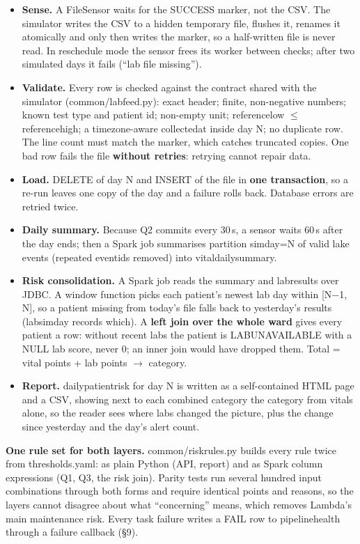 \documentclass[11pt,a4paper]{article}
\newcommand{\ubreak}{\textunderscore\allowbreak}
\newcommand{\code}[1]{{\small\ttfamily\let\_\ubreak #1}}
\begin{document}
\begin{itemize}
\item \textbf{Sense.} A FileSensor waits for the \code{\_SUCCESS} marker, not the CSV. The simulator writes the CSV
  to a hidden temporary file, flushes it, renames it atomically and only then writes the marker, so a half-written
  file is never read. In \code{reschedule} mode the sensor frees its worker between checks; after two simulated days
  it fails (``lab file missing'').
\item \textbf{Validate.} Every row is checked against the contract shared with the simulator
  (\code{common/lab\_feed.py}): exact header; finite, non-negative numbers; known test type and patient id;
  non-empty unit; \code{reference\_low $\leq$ reference\_high}; a timezone-aware \code{collected\_at} inside day N;
  no duplicate row. The line count must match the marker, which catches truncated copies. One bad row fails the
  file \textbf{without retries}: retrying cannot repair data.
\item \textbf{Load.} \code{DELETE} of day N and \code{INSERT} of the file in \textbf{one transaction}, so a re-run
  leaves one copy of the day and a failure rolls back. Database errors are retried twice.
\item \textbf{Daily summary.} Because Q2 commits every 30\,s, a sensor waits 60\,s after the day ends; then a Spark
  job summarises partition \code{sim\_day=N} of valid lake events (repeated \code{event\_id}s removed) into
  \code{vital\_daily\_summary}.
\item \textbf{Risk consolidation.} A Spark job reads the summary and \code{lab\_results} over JDBC. A window function
  picks each patient's newest lab day within [N$-$1, N], so a patient missing from today's file falls back to
  yesterday's results (\code{lab\_sim\_day} records which). A \textbf{left join over the whole ward} gives every
  patient a row: without recent labs the patient is \code{LAB\_UNAVAILABLE} with a NULL lab score, never 0; an inner
  join would have dropped them. Total = vital points + lab points $\rightarrow$ category.
\item \textbf{Report.} \code{daily\_patient\_risk} for day N is written as a self-contained HTML page and a CSV,
  showing next to each combined category the category from vitals alone, so the reader sees where labs changed the
  picture, plus the change since yesterday and the day's alert count.
\end{itemize}

\textbf{One rule set for both layers.} \code{common/risk\_rules.py} builds every rule twice from
\code{thresholds.yaml}: as plain Python (API, report) and as Spark column expressions (Q1, Q3, the risk join).
Parity tests run several hundred input combinations through both forms and require identical points and reasons,
so the layers cannot disagree about what ``concerning'' means, which removes Lambda's main maintenance risk. Every
task failure writes a \code{FAIL} row to \code{pipeline\_health} through a failure callback (\S9).
\end{document}
